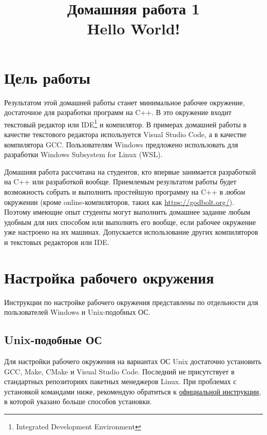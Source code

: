 \documentclass[14pt]{extarticle}
\title{Домашняя работа 1 \\ Hello World!}
\begin{document}
\maketitle

\tableofcontents

\section{Цель работы}

Результатом этой домашней работы станет минимальное рабочее окружение, достаточное для разработки
программ на C++.
В это окружение входит текстовый редактор или IDE\footnote{Integrated Development Environment}
и компилятор.
В примерах домашней работы в качестве текстового редактора используется Visual Studio Code, а в
качестве компилятора \textemdash \space GCC.
Пользователям Windows предложено использовать для разработки Windows Subsystem for Linux (WSL).

Домашняя работа рассчитана на студентов, кто впервые занимается разработкой на C++ или разработкой
вообще.
Приемлемым результатом работы будет возможность собрать и выполнить простейшую программу на C++ в
\textit{любом} окружении (кроме online-компиляторов, таких как \url{https://godbolt.org/}).
Поэтому имеющие опыт студенты могут выполнить домашнее задание любым удобным для них способом или
выполнять его вообще, если рабочее окружение уже настроено на их машинах.
Допускается использование других компиляторов и текстовых редакторов или IDE.

\section{Настройка рабочего окружения}

Инструкции по настройке рабочего окружения представлены по отдельности для пользователей
Windows и Unix-подобных ОС.

\subsection{Unix-подобные ОС}

Для настройки рабочего окружения на вариантах ОС Unix достаточно установить
GCC, Make, CMake и Visual Studio Code.
Последний не присутствует в стандартных репозиториях пакетных менеджеров Linux.
При проблемах с установкой командами ниже, рекомендую обратиться к
\href{https://code.visualstudio.com/docs/setup/linux}{официальной инструкции},
в которой указано больше способов установки.
\end{document}
